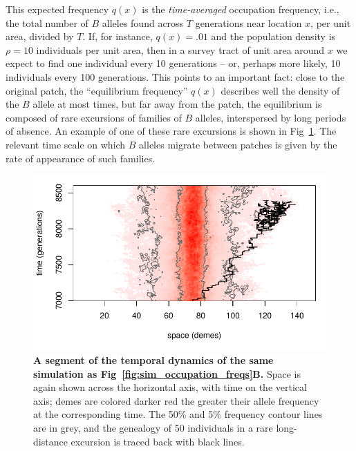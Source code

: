 \documentclass[10pt,letterpaper]{article}
\begin{document}
This expected frequency $q(x)$ is the \emph{time-averaged} occupation frequency,
i.e., the total number of $B$ alleles found across $T$ generations near location $x$, per unit area, divided by $T$.
If, for instance, $q(x)=.01$ and the population density is $\rho=10$ individuals per unit area, 
then in a survey tract of unit area around $x$ we expect to find one individual every 10 generations
-- or, perhaps more likely, 10 individuals every 100 generations.
This points to an important fact: 
close to the original patch, the ``equilibrium frequency'' $q(x)$ describes well the density of the $B$ allele at most times,
but far away from the patch, 
the equilibrium is composed of rare excursions of families of $B$
alleles, interspersed by long periods of absence. 
An example of one of these rare excursions is shown in Fig~\ref{fig:sim_snapshots}.
The relevant time scale on which $B$ alleles migrate between patches is given by the rate of appearance of such families.

\begin{figure}[ht!]
  \begin{center}
    \includegraphics{sim-snapshots}
  \end{center}
  \caption{
      \textbf{A segment of the temporal dynamics of the same simulation as Fig~\ref{fig:sim_occupation_freqs}B.}
  Space is again shown across the horizontal axis, with time on the vertical axis; 
  demes are colored darker red the greater their allele frequency at the corresponding time.
  The 50\% and 5\% frequency contour lines are in grey,
  and the genealogy of 50 individuals in a rare long-distance excursion is traced back with black lines.
  }   \label{fig:sim_snapshots}
\end{figure}
\end{document}
